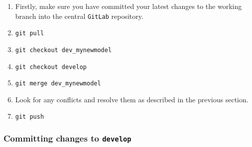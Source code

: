 \begin{enumerate}

\item Firstly, make sure you have committed your latest changes to the working
  branch into the central \texttt{GitLab} repository.

\item \texttt{git pull}

\item \texttt{git checkout dev\_mynewmodel}

\item \texttt{git checkout develop}

\item \texttt{git merge dev\_mynewmodel}

\item Look for any conflicts and resolve them as described in the previous
  section.

\item \texttt{git push}

\end{enumerate}

\subsubsection{Committing changes to \texttt{develop}}

